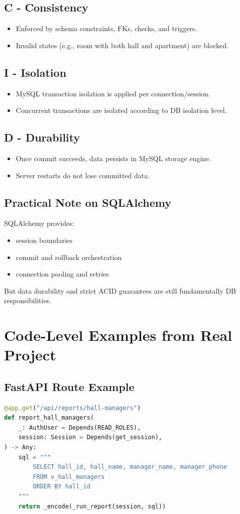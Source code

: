 \documentclass[11pt,a4paper]{article}
\begin{document}
\subsection{C - Consistency}
\begin{itemize}
  \item Enforced by schema constraints, FKs, checks, and triggers.
  \item Invalid states (e.g., room with both hall and apartment) are blocked.
\end{itemize}

\subsection{I - Isolation}
\begin{itemize}
  \item MySQL transaction isolation is applied per connection/session.
  \item Concurrent transactions are isolated according to DB isolation level.
\end{itemize}

\subsection{D - Durability}
\begin{itemize}
  \item Once commit succeeds, data persists in MySQL storage engine.
  \item Server restarts do not lose committed data.
\end{itemize}

\subsection{Practical Note on SQLAlchemy}
SQLAlchemy provides:
\begin{itemize}
  \item session boundaries
  \item commit and rollback orchestration
  \item connection pooling and retries
\end{itemize}
But data durability and strict ACID guarantees are still fundamentally DB responsibilities.

\section{Code-Level Examples from Real Project}
\subsection{FastAPI Route Example}
\begin{lstlisting}[language=Python,caption={Report route structure}]
@app.get("/api/reports/hall-managers")
def report_hall_managers(
    _: AuthUser = Depends(READ_ROLES),
    session: Session = Depends(get_session),
) -> Any:
    sql = """
        SELECT hall_id, hall_name, manager_name, manager_phone
        FROM v_hall_managers
        ORDER BY hall_id
    """
    return _encode(_run_report(session, sql))
\end{lstlisting}
\end{document}
